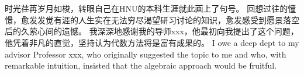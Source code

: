 \section*{\hfill \xiaoer{} \hfill}
    时光荏苒岁月如梭，转眼自己在HNU的本科生涯就此画上了句号。
    回想过往的憧憬，愈发发觉有涯的人生实在无法穷尽渴望研习讨论的知识，愈发感受到愿景落空后的久萦心间的遗憾。
    我深深地感谢我的导师xxx，他最初向我提出了这个问题，他凭着非凡的直觉，坚持认为代数方法将是富有成果的。
    I owe a deep dept to my advisor Professor xxx, who originally suggested the topic to me and who, 
    with remarkable intuition, insisted that the algebraic approach would be fruitful.
    \newpage
